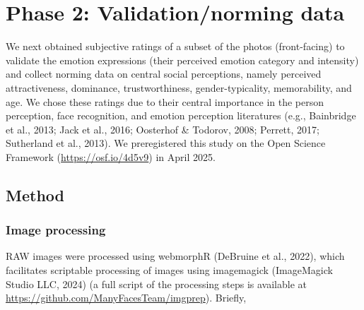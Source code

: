 \documentclass[
  letterpaper,
  DIV=11,
  numbers=noendperiod]{scrartcl}
\begin{document}
\section{Phase 2: Validation/norming
data}\label{phase-2-validationnorming-data}

We next obtained subjective ratings of a subset of the photos
(front-facing) to validate the emotion expressions (their perceived
emotion category and intensity) and collect norming data on central
social perceptions, namely perceived attractiveness, dominance,
trustworthiness, gender-typicality, memorability, and age. We chose
these ratings due to their central importance in the person perception,
face recognition, and emotion perception literatures (e.g., Bainbridge
et al., 2013; Jack et al., 2016; Oosterhof \& Todorov, 2008; Perrett,
2017; Sutherland et al., 2013). We preregistered this study on the Open
Science Framework (\url{https://osf.io/4d5v9}) in April 2025.

\subsection{Method}\label{method-1}

\subsubsection{Image processing}\label{image-processing}

RAW images were processed using webmorphR (DeBruine et al., 2022), which
facilitates scriptable processing of images using imagemagick
(ImageMagick Studio LLC, 2024) (a full script of the processing steps is
available at \url{https://github.com/ManyFacesTeam/imgprep}). Briefly,
\end{document}

